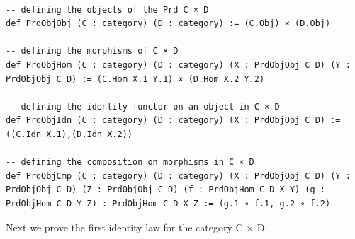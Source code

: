 \documentclass{book}
\newcounter{lcounter}
\begin{document}
\begin{center}
\begin{tcolorbox}[width=5in,colback={white},title={\begin{center}\texttt{Lean \thelcounter} \addtocounter{lcounter}{1}  \end{center}},colbacktitle=Blue,coltitle=black]
\begin{verbatim}

-- defining the objects of the Prd C × D
def PrdObjObj (C : category) (D : category) := (C.Obj) × (D.Obj)

-- defining the morphisms of C × D
def PrdObjHom (C : category) (D : category) (X : PrdObjObj C D) (Y : PrdObjObj C D) := (C.Hom X.1 Y.1) × (D.Hom X.2 Y.2)

-- defining the identity functor on an object in C × D
def PrdObjIdn (C : category) (D : category) (X : PrdObjObj C D) := ((C.Idn X.1),(D.Idn X.2))

-- defining the composition on morphisms in C × D
def PrdObjCmp (C : category) (D : category) (X : PrdObjObj C D) (Y : PrdObjObj C D) (Z : PrdObjObj C D) (f : PrdObjHom C D X Y) (g : PrdObjHom C D Y Z) : PrdObjHom C D X Z := (g.1 ∘ f.1, g.2 ∘ f.2)

\end{verbatim}%
\end{tcolorbox}
\end{center}

Next we prove the first identity law for the category C × D:
\end{document}
